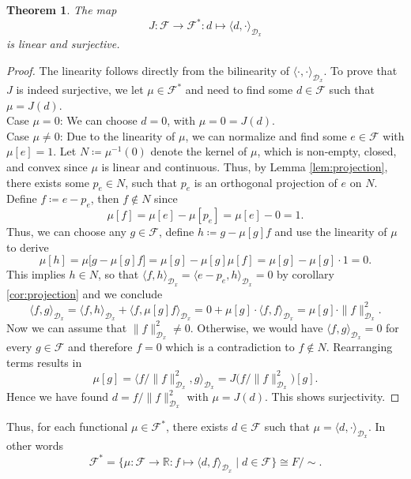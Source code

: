 \documentclass[11pt, a4paper]{article}
\newtheorem{theorem}{Theorem}[section]
\newcommand{\R}{\mathbb{R}}
\newcommand{\D}{\mathcal{D}}
\newcommand{\F}{\mathcal{F}}
\begin{document}
\begin{theorem} \label{thm:riesz}
The map
\[ J: \F \to \F^* : d \mapsto \langle d, \cdot \rangle_{\D_x} \]
is linear and surjective.
\end{theorem}

\begin{proof}
The linearity follows directly from the bilinearity of $\langle \cdot, \cdot \rangle_{\D_x}$. To prove that $J$ is indeed surjective, we let $\mu \in \F^*$ and need to find some $d \in \F$ such that $\mu = J(d)$. \\

Case $\mu=0$: We can choose $d=0$, with $\mu = 0 = J(d)$. \\

Case $\mu \neq 0$: Due to the linearity of $\mu$, we can normalize and find some $e \in \F$ with $\mu[e] = 1$. Let $N \coloneq \mu^{-1}(0)$ denote the kernel of $\mu$, which is non-empty, closed, and convex since $\mu$ is linear and continuous. Thus, by Lemma \ref{lem:projection}, there exists some $p_e \in N$, such that $p_e$ is an orthogonal projection of $e$ on $N$. Define $f \coloneq e - p_e$, then $f \notin N$ since
\[ \mu[f] = \mu[e] - \mu[p_e] = \mu[e] - 0 = 1. \]
Thus, we can choose any $g \in \F$, define $h \coloneq g - \mu[g]f$ and use the linearity of $\mu$ to derive
\[ \mu[h] = \mu \big [g- \mu[g]f \big] = \mu[g] - \mu[g] \mu[f] = \mu[g] - \mu[g] \cdot 1 = 0. \]
This implies $h \in N$, so that $\langle f , h \rangle_{\D_x} = \langle e - p_e, h \rangle_{\D_x} = 0$ by corollary \ref{cor:projection} and we conclude
\[ \langle f, g \rangle_{\D_x} = \langle f , h \rangle_{\D_x} + \langle f , \mu[g]f \rangle_{\D_x} = 0 + \mu[g] \cdot \langle f , f \rangle_{\D_x} = \mu[g] \cdot \| f \|_{\D_x}^2. \]
Now we can assume that $\| f \|_{\D_x}^2 \neq 0$. Otherwise, we would have $\langle f, g \rangle_{\D_x} = 0$ for every $g \in \F$ and therefore $f = 0$ which is a contradiction to $f \notin N$. Rearranging terms results in
\[ \mu[g] = \big \langle f / \| f \|_{\D_x}^2 , g \big \rangle_{\D_x} = J \big (f / \| f \|_{\D_x}^2 \big)[g]. \]
Hence we have found $d = f / \| f \|_{\D_x}^2$ with $\mu = J(d)$. This shows surjectivity.
\end{proof}

Thus, for each functional $\mu \in \F^*$, there exists $d \in \F$ such that $\mu = \langle d, \cdot \rangle_{\D_x}$. In other words
\[ \F^* = \Big \{ \mu : \F \to \R : f \mapsto \langle d,f \rangle _{\D_x} \mid d \in \F \Big \} \cong F/{\sim}. \]
\end{document}
